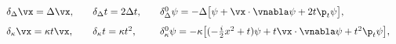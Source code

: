 \begin{equation}
     \begin{array}{ccc}
    \delta_{\Delta}\vx=\Delta\vx,\quad\hfill
    &\delta_{\Delta}t=2\Delta t,\quad\hfill
    &\delta^0_{\Delta}\psi=
    -\Delta\big[\psi+\vx\cdot\vnabla\psi+2t\p_{t}\psi\big],\hfill
\\[8pt]
\delta_{\kappa}\vx=\kappa t\vx,\,\hfill
&\delta_{\kappa}t=\kappa t^2,\,\hfill
&\delta^0_{\kappa}\psi=-\kappa\big[(-\frac{i}{2}x^2+t)\psi
+t\vx\cdot\vnabla\psi+t^2\p_{t}\psi\big],\hfill
\end{array}
\label{dilexp}
\end{equation}

